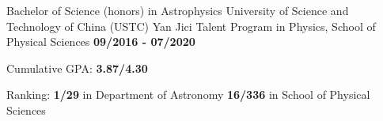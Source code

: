
\begin{cventries}
  \cventry
    {\textnormal{Bachelor of Science (honors) in Astrophysics}} 
    {University of Science and Technology of China (USTC)\newline
    \textnormal{Yan Jici Talent Program in Physics, School of Physical Sciences}} 
    {\textcolor{awesome-emerald}{\textbf{09/2016 - 07/2020}}}
    {
      \begin{cvitems} %
         \item{\textnormal{Cumulative GPA:} \textbf{3.87/4.30}}
         \item{\textnormal{Ranking:} \textbf{1/29} \textnormal{in Department of Astronomy}
         \newline
         \hspace{1.3cm}\textbf{16/336} \textnormal{in School of Physical Sciences}}
      \end{cvitems}
    }
\end{cventries}

